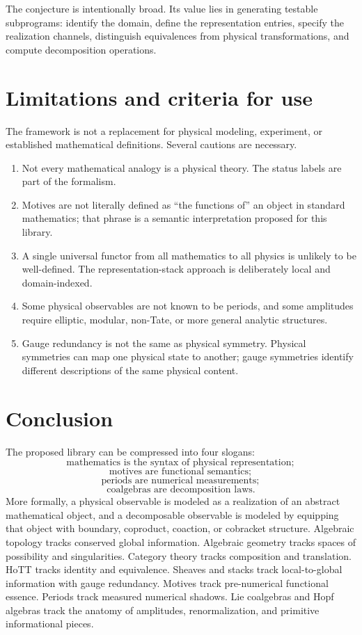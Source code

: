 \documentclass[11pt]{article}
\begin{document}
The conjecture is intentionally broad. Its value lies in generating testable subprograms: identify the domain, define the representation entries, specify the realization channels, distinguish equivalences from physical transformations, and compute decomposition operations.

\section{Limitations and criteria for use}

The framework is not a replacement for physical modeling, experiment, or established mathematical definitions. Several cautions are necessary.

\begin{enumerate}
    \item Not every mathematical analogy is a physical theory. The status labels are part of the formalism.
    \item Motives are not literally defined as ``the functions of'' an object in standard mathematics; that phrase is a semantic interpretation proposed for this library.
    \item A single universal functor from all mathematics to all physics is unlikely to be well-defined. The representation-stack approach is deliberately local and domain-indexed.
    \item Some physical observables are not known to be periods, and some amplitudes require elliptic, modular, non-Tate, or more general analytic structures.
    \item Gauge redundancy is not the same as physical symmetry. Physical symmetries can map one physical state to another; gauge symmetries identify different descriptions of the same physical content.
\end{enumerate}

\section{Conclusion}

The proposed library can be compressed into four slogans:
\[
\boxed{\text{mathematics is the syntax of physical representation};}
\]
\[
\boxed{\text{motives are functional semantics};}
\]
\[
\boxed{\text{periods are numerical measurements};}
\]
\[
\boxed{\text{coalgebras are decomposition laws}.}
\]
More formally, a physical observable is modeled as a realization of an abstract mathematical object, and a decomposable observable is modeled by equipping that object with boundary, coproduct, coaction, or cobracket structure. Algebraic topology tracks conserved global information. Algebraic geometry tracks spaces of possibility and singularities. Category theory tracks composition and translation. HoTT tracks identity and equivalence. Sheaves and stacks track local-to-global information with gauge redundancy. Motives track pre-numerical functional essence. Periods track measured numerical shadows. Lie coalgebras and Hopf algebras track the anatomy of amplitudes, renormalization, and primitive informational pieces.
\end{document}
